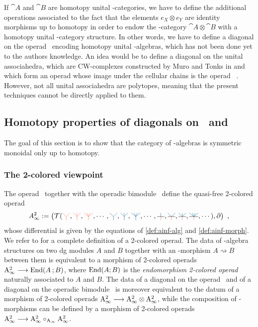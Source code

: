\documentclass[10pt]{amsart}
\theoremstyle{remark}
\begin{document}
If $\cat{A}$ and $\cat{B}$ are homotopy unital \Ainf -categories, we have to define the additional operations associated to the fact that the elements $e_X \otimes e_Y$ are identity morphisms up to homotopy in order to endow the \Ainf -category $\cat{A} \otimes \cat{B}$ with a homotopy unital \Ainf -category structure. In other words, we have to define a diagonal on the operad \uAinf\ encoding homotopy unital \Ainf -algebras, which has not been done yet to the authors knowledge. An idea would be to define a diagonal on the unital associahedra, which are CW-complexes constructed by Muro and Tonks in \cite{MuroTonks} and which form an operad whose image under the cellular chains is the operad \uAinf\ . However, not all unital associahedra are polytopes, meaning that the present techniques cannot be directly applied to them. 

\subsection{Homotopy properties of diagonals on \Ainf\ and \Minf } \label{ss:homotopy-properties}
The goal of this section is to show that the category of \Ainf -algebras is symmetric monoidal only up to homotopy.

\subsubsection{The 2-colored viewpoint}

The operad \Ainf\ together with the operadic bimodule \Minf\ define the quasi-free 2-colored operad 
\[ A_\infty^2 := \left( \mathcal{T} (\arbreopdeuxcol{Red!60} , \arbreoptroiscol{Red!60} , \arbreopquatrecol{Red!60}, \cdots, \arbreopdeuxcol{MidnightBlue} , \arbreoptroiscol{MidnightBlue} , \arbreopquatrecol{MidnightBlue} , \cdots, \arbreopunmorph , \arbreopdeuxmorph , \arbreoptroismorph , \arbreopquatremorph , \cdots )  , \partial \right) \ , \]
whose differential is given by the equations of \cref{def:ainf-alg} and \cref{def:ainf-morph}.
We refer to \cite[Section 11]{yau-colored} for a complete definition of a 2-colored operad.
The data of \Ainf -algebra structures on two dg modules $A$ and $B$ together with an \Ainf -morphism $A \rightsquigarrow B$ between them is equivalent to a morphism of 2-colored operads $\mathrm{A}_\infty^2 \longrightarrow \mathrm{End} ( A \text{\hspace{2pt}} ; B) $, where $\mathrm{End} ( A ; B)$ is the \textit{endomorphism 2-colored operad} naturally associated to $A$ and $B$.
The data of a diagonal on the operad \Ainf\ and of a diagonal on the operadic bimodule \Minf\ is moreover equivalent to the datum of a morphism of 2-colored operads $\mathrm{A}_\infty^2 \longrightarrow \mathrm{A}_\infty^2 \otimes \mathrm{A}_\infty^2$, while the composition of \Ainf -morphisms can be defined by a morphism of 2-colored operads $\mathrm{A}_\infty^2 \longrightarrow \mathrm{A}_\infty^2 \circ_{\mathrm{A}_\infty} \mathrm{A}_\infty^2 $.
\end{document}
